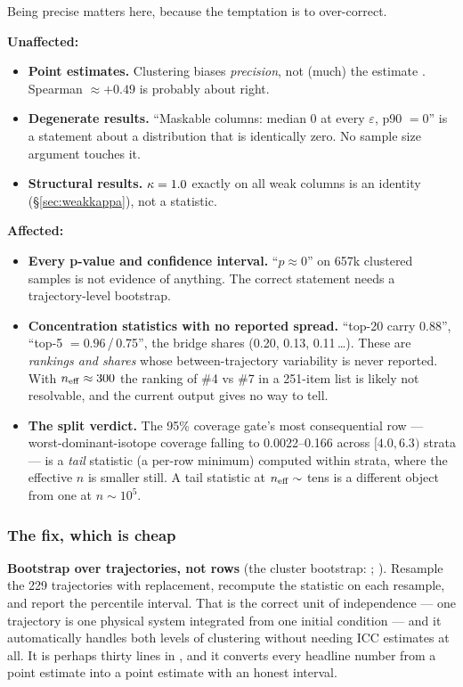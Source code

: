 Being precise matters here, because the temptation is to over-correct.

\textbf{Unaffected:}
\begin{itemize}
\item \textbf{Point estimates.} Clustering biases \emph{precision}, not (much)
  the estimate \citep{cameron2015}. Spearman $\approx +0.49$ is probably about
  right.
\item \textbf{Degenerate results.} ``Maskable columns: median 0 at every
  $\varepsilon$, p90 $= 0$''  is a statement about a
  distribution that is identically zero. No sample size argument touches it.
\item \textbf{Structural results.} $\kappa = 1.0$ exactly on all weak columns is
  an identity (\S\ref{sec:weakkappa}), not a statistic.
\end{itemize}

\textbf{Affected:}
\begin{itemize}
\item \textbf{Every p-value and confidence interval.} ``$p \approx 0$'' on 657k
  clustered samples is not evidence of anything. The correct statement needs a
  trajectory-level bootstrap.
\item \textbf{Concentration statistics with no reported spread.} ``top-20 carry
  0.88'', ``top-5 $= 0.96$\,/\,0.75'', the bridge shares (0.20, 0.13,
  0.11\,\ldots). These are \emph{rankings and shares} whose between-trajectory
  variability is never reported. With $n_{\rm eff} \approx 300$ the ranking of
  \#4 vs \#7 in a 251-item list is likely not resolvable, and the current output
  gives no way to tell.
\item \textbf{The split verdict.} The 95\% coverage gate's most consequential
  row --- worst-dominant-isotope coverage falling to 0.0022--0.166 across
  $[4.0, 6.3)$ strata --- is a \emph{tail} statistic (a per-row minimum)
  computed within strata, where the effective $n$ is smaller still. A tail
  statistic at $n_{\rm eff} \sim$ tens is a different object from one at
  $n \sim 10^{5}$.
\end{itemize}

\subsubsection{The fix, which is cheap}
\label{sec:clusterrobust-fix}

\textbf{Bootstrap over trajectories, not rows} (the cluster bootstrap:
\citealp[\S3.8]{davison1997}; \citealp{field2007}). Resample the 229
trajectories with replacement, recompute the statistic on each resample, and
report the percentile interval. That is the correct unit of independence --- one
trajectory is one physical system integrated from one initial condition --- and
it automatically handles both levels of clustering without needing ICC estimates
at all. It is perhaps thirty lines in , and it converts every
headline number from a point estimate into a point estimate with an honest
interval.


